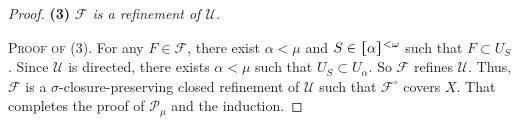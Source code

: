 \documentclass[jisng7iii.tex]{subfiles}
\begin{document}
\begin{proof}
\textbf{(3)} \textit{$\mathscr{F}$ is a refinement of $\mathscr{U}$.}

 \noindent\textsc{Proof of (3)}. For any $F\in \mathscr{F}$, there exist $\alpha<\mu$ and $S\in \hstretch{1.8}{[}\alpha\hstretch{1.8}{]}^{<\omega}$
 such that $F\subset  U_S$. %
Since $\mathscr{U}$ is directed, there exists  $\alpha< \mu$ such that $U_S \subset U_\alpha$. 
So $\mathscr{F}$ refines $\mathscr{U}$.
Thus, $\mathscr{F}$ is a $\sigma$-closure-preserving  closed refinement of $\mathscr{U}$ 
such that $\mathcal{F}^\circ$ covers $X$.
That completes the proof of $\mathcal{P}_\mu$ and the induction.
\end{proof}
\end{document}
